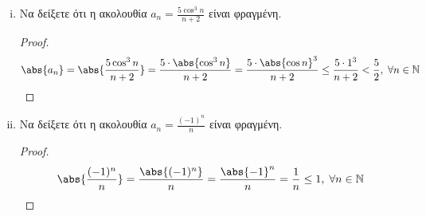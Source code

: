 \begin{enumerate}
\begin{enumerate}[i)]
                \begin{proof}
                    \begin{align*}
                        \abs{\frac{\cos{n} + n \sin{n}}{n^{2}}} = 
                        \frac{\abs{\cos{n} + n \sin{n}}}{n^{2}} \leq 
                        \frac{\abs{\cos{n}} + \abs{n \sin{n}}}{n^{2}} 
               &= \frac{\abs{\cos{n}} + n \abs{\sin{n}}}{n^{2}} \leq 
               \frac{1 + n\cdot 1}{n^{2}} = \\
               &= \frac{1}{n^{2}} + \frac{1}{n} \leq 
               1 + 1 = 2, \; \forall n \in \mathbb{N}
                    \end{align*} 
                \end{proof}

            \item Να δείξετε ότι η ακολουθία $ a_{n} = \frac{5 \cos^{3}{n}}{n+2} $ 
                είναι φραγμένη.

                \begin{proof}
                    \[
                        \abs{a_{n}} = \abs{\frac{5 \cos^{3}{n}}{n+2}} = 
                        \frac{5 \cdot \abs{\cos^{3}{n}}}{n+2} = \frac{5\cdot 
                        \abs{\cos{n}}^ {3}}{n+2} \leq  \frac{5 \cdot 1^{3}}{n+2} < 
                        \frac{5}{2}, \; \forall n \in \mathbb{N}
                    \]
                \end{proof}



            \item Να δείξετε ότι η ακολουθία $ a_{n} = \frac{(-1)^{n}}{n} $ είναι 
                φραγμένη.

                \begin{proof}
                    \[
                        \abs{\frac{(-1)^{n}}{n}} = \frac{\abs{(-1)^{n}}}{n} = 
                        \frac{\abs{-1}^{n}}{n} = \frac{1}{n} \leq 1, \; \forall n \in 
                        \mathbb{N} 
                    \] 
                \end{proof}


\end{enumerate}
\end{enumerate}
